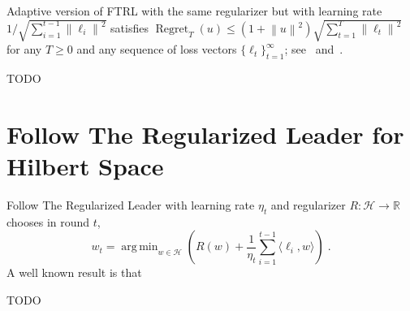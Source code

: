\documentclass{colt2016} %
\DeclareMathOperator{\Regret}{Regret}
\newcommand{\R}{\mathbb{R}}     %
\renewcommand{\H}{\mathcal{H}}  %
\newcommand{\norm}[1]{\left\|{#1}\right\|}
\DeclareMathOperator*{\argmin}{arg\,min}
\begin{document}
Adaptive version of FTRL with the same regularizer but with learning rate
$1/\sqrt{\sum_{i=1}^{t-1} \norm{\ell_i}^2}$ satisfies $\Regret_T(u) \le
(1+\norm{u}^2) \sqrt{\sum_{t=1}^T \norm{\ell_t}^2}$ for any $T \ge 0$ and any
sequence of loss vectors $\{\ell_t\}_{t=1}^\infty$; see~\cite{Orabona-Pal-2015}
and~\cite{Duchi-Hazan-Singer-2011}.

TODO



\appendix

\section{Follow The Regularized Leader for Hilbert Space}

Follow The Regularized Leader with learning rate $\eta_t$ and regularizer $R:\H \to \R$
chooses in round $t$,
$$
w_t = \argmin_{w \in \H} \left( R(w) + \frac{1}{\eta_t} \sum_{i=1}^{t-1} \langle \ell_i, w \rangle \right) \; .
$$
A well known result is that

TODO
\end{document}
